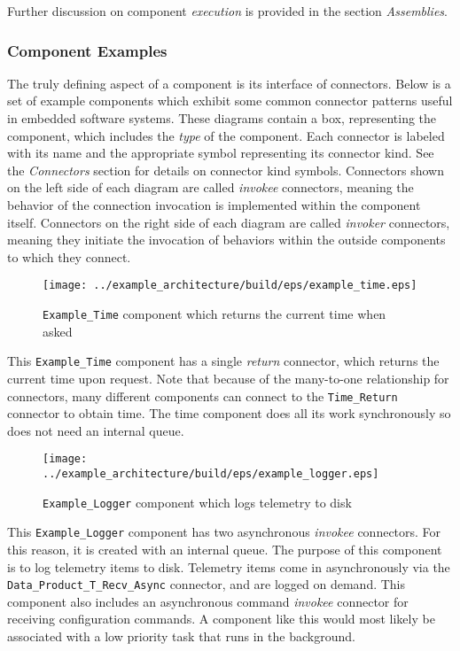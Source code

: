 Further discussion on component \textit{execution} is provided in the section \textit{Assemblies}.

\subsubsection{Component Examples}

The truly defining aspect of a component is its interface of connectors. Below is a set of example components which exhibit some common connector patterns useful in embedded software systems. These diagrams contain a box, representing the component, which includes the \textit{type} of the component. Each connector is labeled with its name and the appropriate symbol representing its connector kind. See the \textit{Connectors} section for details on connector kind symbols. Connectors shown on the left side of each diagram are called \textit{invokee} connectors, meaning the behavior of the connection invocation is implemented within the component itself. Connectors on the right side of each diagram are called \textit{invoker} connectors, meaning they initiate the invocation of behaviors within the outside components to which they connect.

\begin{figure}[H]
  \texttt{[image: ../example\_architecture/build/eps/example\_time.eps]}
  \caption{\texttt{Example\_Time} component which returns the current time when asked}
\end{figure}

This \texttt{Example\_Time} component has a single \textit{return} connector, which returns the current time upon request. Note that because of the many-to-one relationship for connectors, many different components can connect to the \texttt{Time\_Return} connector to obtain time. The time component does all its work synchronously so does not need an internal queue.

\begin{figure}[H]
  \texttt{[image: ../example\_architecture/build/eps/example\_logger.eps]}
  \caption{\texttt{Example\_Logger} component which logs telemetry to disk}
\end{figure}

This \texttt{Example\_Logger} component has two asynchronous \textit{invokee} connectors. For this reason, it is created with an internal queue. The purpose of this component is to log telemetry items to disk. Telemetry items come in asynchronously via the \texttt{Data\_Product\_T\_Recv\_Async} connector, and are logged on demand. This component also includes an asynchronous command \textit{invokee} connector for receiving configuration commands. A component like this would most likely be associated with a low priority task that runs in the background.

